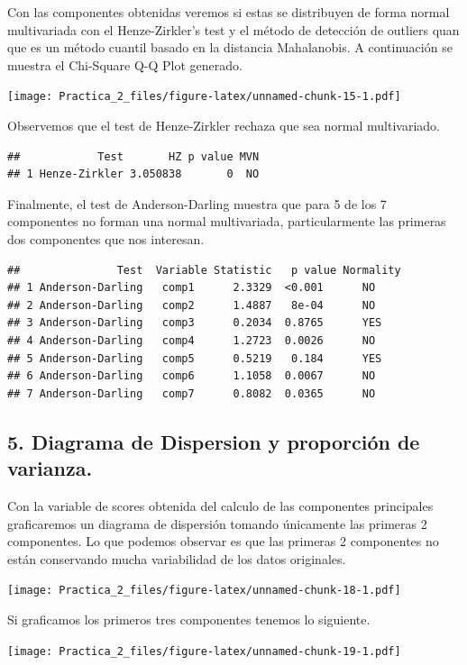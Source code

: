 \documentclass[
]{article}
\begin{document}
Con las componentes obtenidas veremos si estas se distribuyen de forma
normal multivariada con el Henze-Zirkler's test y el método de detección
de outliers quan que es un método cuantil basado en la distancia
Mahalanobis. A continuación se muestra el Chi-Square Q-Q Plot generado.

\texttt{[image: Practica\_2\_files/figure-latex/unnamed-chunk-15-1.pdf]}

Observemos que el test de Henze-Zirkler rechaza que sea normal
multivariado.

\begin{verbatim}
##            Test       HZ p value MVN
## 1 Henze-Zirkler 3.050838       0  NO
\end{verbatim}

Finalmente, el test de Anderson-Darling muestra que para 5 de los 7
componentes no forman una normal multivariada, particularmente las
primeras dos componentes que nos interesan.

\begin{verbatim}
##               Test  Variable Statistic   p value Normality
## 1 Anderson-Darling   comp1      2.3329  <0.001      NO    
## 2 Anderson-Darling   comp2      1.4887   8e-04      NO    
## 3 Anderson-Darling   comp3      0.2034  0.8765      YES   
## 4 Anderson-Darling   comp4      1.2723  0.0026      NO    
## 5 Anderson-Darling   comp5      0.5219   0.184      YES   
## 6 Anderson-Darling   comp6      1.1058  0.0067      NO    
## 7 Anderson-Darling   comp7      0.8082  0.0365      NO
\end{verbatim}

\hypertarget{diagrama-de-dispersion-y-proporciuxf3n-de-varianza.}{%
\subsection{5. Diagrama de Dispersion y proporción de
varianza.}\label{diagrama-de-dispersion-y-proporciuxf3n-de-varianza.}}

Con la variable de scores obtenida del calculo de las componentes
principales graficaremos un diagrama de dispersión tomando únicamente
las primeras 2 componentes. Lo que podemos observar es que las primeras
2 componentes no están conservando mucha variabilidad de los datos
originales.

\texttt{[image: Practica\_2\_files/figure-latex/unnamed-chunk-18-1.pdf]}

Si graficamos los primeros tres componentes tenemos lo siguiente.

\texttt{[image: Practica\_2\_files/figure-latex/unnamed-chunk-19-1.pdf]}
\end{document}
